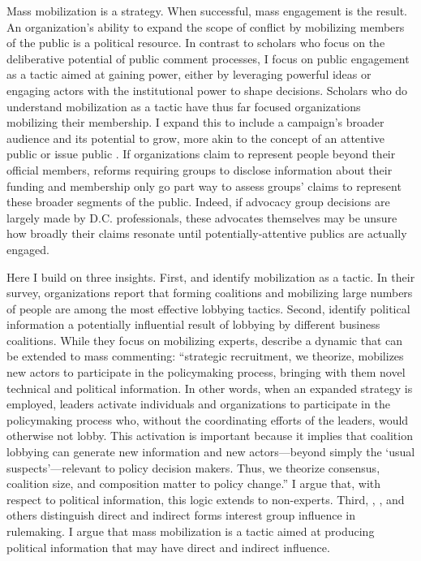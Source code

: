 Mass mobilization is a strategy. When successful, mass engagement is the result. An organization's ability to expand the scope of conflict by mobilizing members of the public is a political resource. 
In contrast to scholars who focus on the deliberative potential of public comment processes, I focus on public engagement as a tactic aimed at gaining power, either by leveraging powerful ideas or engaging actors with the institutional power to shape decisions.
Scholars who do understand mobilization as a tactic \citep{Furlong1997, Kerwin2011} have thus far focused organizations mobilizing their membership. %
I expand this to include a campaign's broader audience and its potential to grow, more akin to the concept of an attentive public \citep{Key1961} or issue public \citep{Converse1964}. If organizations claim to represent people beyond their official members, 
reforms requiring groups to disclose information about their funding and membership \citep{Seifter2016UCLA} only go part way to assess groups' claims to represent these broader segments of the public. Indeed, if advocacy group decisions are largely made by D.C. professionals, these advocates themselves may be unsure how broadly their claims resonate until potentially-attentive publics are actually engaged.

Here I build on three insights. First, \citet{Kerwin2011} and \citet{Furlong1997} identify mobilization as a tactic. In their survey, organizations report that forming coalitions and mobilizing large numbers of people are among the most effective lobbying tactics. Second, \citet{Nelson2012} identify political information a potentially influential result of lobbying by different business coalitions. While they focus on mobilizing experts, \citet{Nelson2012} describe a dynamic that can be extended to mass commenting: 
``strategic recruitment, we theorize, mobilizes new actors to participate in the policymaking process, bringing with them novel technical and political information. In other words, when an expanded strategy is employed, leaders activate individuals and organizations to participate in the policymaking process who, without the coordinating efforts of the leaders, would otherwise not lobby. This activation is important because it implies that coalition lobbying can generate new information and new actors---beyond simply the `usual suspects'---relevant to policy decision makers. Thus, we theorize consensus, coalition size, and composition matter to policy change.'' 
I argue that, with respect to political information, this logic extends to non-experts. 
Third, \citet{Furlong1998}, \citet{Yackee2006JPART}, and others distinguish direct and indirect forms interest group influence in rulemaking. I argue that mass mobilization is a tactic aimed at producing political information that may have direct and indirect influence. 

